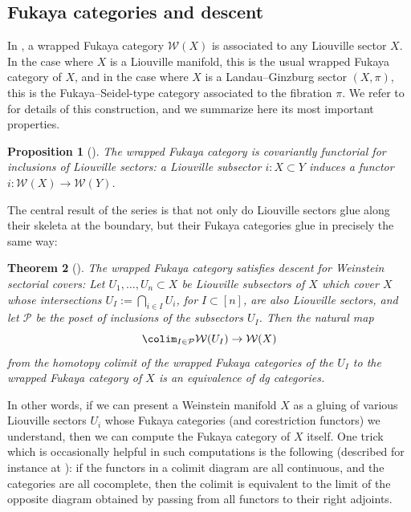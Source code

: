 \documentclass[10pt,a4paper]{amsart}
\numberwithin{equation}{section}
\newtheorem{Theorem}{Theorem}[section]
\newtheorem{Proposition}[Theorem]{Proposition}
\def\cW{\mathcal{W}}
\def\calP{\mathcal{P}}
\begin{document}
\subsection{Fukaya categories and descent}
In \cite{GPS1}, a wrapped Fukaya category $\cW(X)$ is associated to any Liouville sector $X$. In the case where $X$ is a Liouville manifold, this is the usual wrapped Fukaya category of $X$, and in the case where $X$ is a Landau--Ginzburg sector $(X,\pi)$, this is the Fukaya--Seidel-type category associated to the fibration $\pi$.
We refer to \cite{GPS2,GPS3,GPS1} for details of this construction, and we summarize here its most important properties.

\begin{Proposition}[\cite{GPS1}]
 The wrapped Fukaya category is covariantly functorial for inclusions of Liouville sectors: a Liouville subsector $i\colon X\subset Y$ induces a functor $i\colon \cW(X)\to \cW(Y)$.
\end{Proposition}

The central result of the series \cite{GPS2,GPS3,GPS1} is that not only do Liouville sectors glue along their skeleta at the boundary, but their Fukaya categories glue in precisely the same way:

\begin{Theorem}[\cite{GPS2}]\label{thm:codescent}
 The wrapped Fukaya category satisfies descent for Weinstein sectorial covers: Let $U_1,\dots,U_n\subset X$ be Liouville subsectors of $X$ which cover $X$ whose intersections $U_I:=\bigcap_{i\in I}U_i$, for $I\subset[n]$, are also Liouville sectors, and let $\calP$ be the poset of inclusions of the subsectors $U_I$. Then the natural map
 \[
 	\colim_{I\in \calP}\cW(U_I)\to \cW(X)
 \]
 from the homotopy colimit of the wrapped Fukaya categories of the $U_I$ to the wrapped Fukaya category of $X$ is an equivalence of dg categories.
\end{Theorem}

In other words, if we can present a Weinstein manifold $X$ as a gluing of various Liouville sectors $U_i$ whose Fukaya categories (and corestriction functors) we understand, then we can compute the Fukaya category of $X$ itself. One trick which is occasionally helpful in such computations is the following (described for instance at \cite[Lemma 1.3.3]{Gaits-DG}): if the functors in a colimit diagram are all continuous, and the categories are all cocomplete, then the colimit is equivalent to the limit of the opposite diagram obtained by passing from all functors to their right adjoints.
\end{document}
